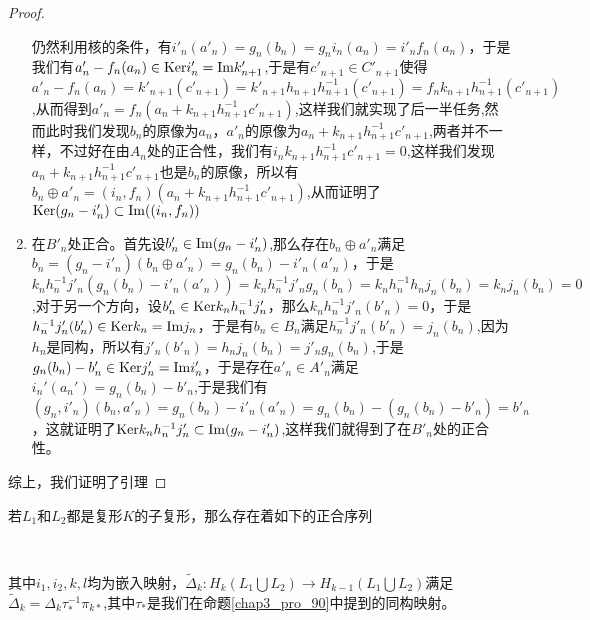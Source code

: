 \begin{proof}
\begin{enumerate}
    仍然利用核的条件，有$i'_{n}(a'_{n})=g_{n}(b_{n})=g_{n}i_{n}(a_{n})=i'_{n}f_{n}(a_{n})$，于是我们有$a'_{n}-f_{n}(a_{n})\in{\rm Ker} i'_{n}={\rm Im} k'_{n+1}$,于是有$c'_{n+1}\in C'_{n+1}$使得$a'_{n}-f_{n}(a_{n})=k'_{n+1}(c'_{n+1})=k'_{n+1}h_{n+1}h_{n+1}^{-1}(c'_{n+1})=f_{n}k_{n+1}h_{n+1}^{-1}(c'_{n+1})$,从而得到$a'_{n}=f_{n}(a_{n}+k_{n+1}h_{n+1}^{-1}c'_{n+1})$,这样我们就实现了后一半任务,然而此时我们发现$b_{n}$的原像为$a_{n}$，$a'_{n}$的原像为$a_{n}+k_{n+1}h_{n+1}^{-1}c'_{n+1}$,两者并不一样，不过好在由$A_{n}$处的正合性，我们有$i_{n}k_{n+1}h_{n+1}^{-1}c'_{n+1}=0$,这样我们发现$a_{n}+k_{n+1}h_{n+1}^{-1}c'_{n+1}$也是$b_{n}$的原像，所以有$b_{n}\oplus a'_{n}=(i_{n},f_{n})(a_{n}+k_{n+1}h_{n+1}^{-1}c'_{n+1})$,从而证明了${\rm Ker} (g_{n}-i'_{n})\subset {\rm Im}((i_{n},f_{n}))$
    \item 在$B'_{n}$处正合。首先设$b_{n}'\in {\rm Im}(g_{n}-i_{n}')$,那么存在$b_{n}\oplus a'_{n}$满足$b_{n}=(g_{n}-i'_{n})(b_{n}\oplus a'_{n})=g_{n}(b_{n})-i'_{n}(a'_{n})$，于是$k_{n}h_{n}^{-1}j'_{n}(g_{n}(b_{n})-i'_{n}(a'_{n}))=k_{n}h_{n}^{-1}j'_{n}g_{n}(b_{n})=k_{n}h_{n}^{-1}h_{n}j_{n}(b_{n})=k_{n}j_{n}(b_{n})=0$,对于另一个方向，设$b_{n}'\in {\rm Ker} k_{n}h_{n}^{-1}j'_{n}$，那么$k_{n}h_{n}^{-1}j'_{n}(b'_{n})=0$，于是$h_{n}^{-1}j'_{n}(b'_{n})\in{\rm Ker} k_{n}={\rm Im} j_{n}$，于是有$b_{n}\in B_{n}$满足$h_{n}^{-1}j'_{n}(b'_{n})=j_{n}(b_{n})$,因为$h_{n}$是同构，所以有$j'_{n}(b'_{n})=h_{n}j_{n}(b_{n})=j'_{n}g_{n}(b_{n})$,于是$g_{n}(b_{n})-b'_{n}\in{\rm Ker} j'_{n}={\rm Im} i'_{n}$，于是存在$a'_{n}\in A'_{n}$满足$i_{n}'(a_{n}')=g_{n}(b_{n})-b'_{n}$,于是我们有$(g_{n},i'_{n})(b_{n},a'_{n})=g_{n}(b_{n})-i'_{n}(a'_{n})=g_{n}(b_{n})-(g_{n}(b_{n})-b'_{n})=b'_{n}$，这就证明了${\rm Ker} k_{n}h_{n}^{-1}j'_{n}\subset {\rm Im} (g_{n}-i'_{n})$,这样我们就得到了在$B'_{n}$处的正合性。
    \end{enumerate}
    综上，我们证明了引理
\end{proof}
\begin{proposition}\label{chap3_pro_553}
若$L_{1}$和$L_{2}$都是复形$K$的子复形，那么存在着如下的正合序列
{\center
\footnotesize
{}\\}
其中$i_{1},i_{2},k,l$均为嵌入映射，$\tilde{\Delta}_{k}:H_{k}(L_{1}\bigcup L_{2})\rightarrow H_{k-1}(L_{1}\bigcup L_{2})$满足$\tilde{\Delta}_{k}=\Delta_{k}\tau_{*}^{-1}\pi_{k*}$,其中$\tau_{*}$是我们在命题\eqref{chap3_pro_90}中提到的同构映射。
\end{proposition}

